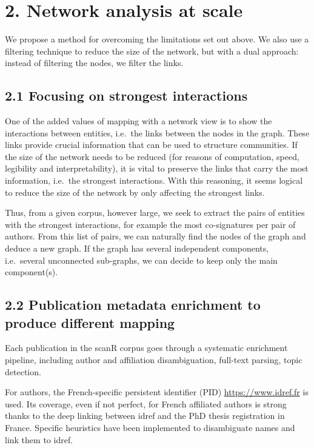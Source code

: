 \documentclass[
]{article}
\begin{document}
\hypertarget{network-analysis-at-scale}{%
\section{2. Network analysis at scale}\label{network-analysis-at-scale}}

We propose a method for overcoming the limitations set out above. We
also use a filtering technique to reduce the size of the network, but
with a dual approach: instead of filtering the nodes, we filter the
links.

\hypertarget{focusing-on-strongest-interactions}{%
\subsection{2.1 Focusing on strongest
interactions}\label{focusing-on-strongest-interactions}}

One of the added values of mapping with a network view is to show the
interactions between entities, i.e.~the links between the nodes in the
graph. These links provide crucial information that can be used to
structure communities. If the size of the network needs to be reduced
(for reasons of computation, speed, legibility and interpretability), it
is vital to preserve the links that carry the most information, i.e.~the
strongest interactions. With this reasoning, it seems logical to reduce
the size of the network by only affecting the strongest links.

Thus, from a given corpus, however large, we seek to extract the pairs
of entities with the strongest interactions, for example the most
co-signatures per pair of authors. From this list of pairs, we can
naturally find the nodes of the graph and deduce a new graph. If the
graph has several independent components, i.e.~several unconnected
sub-graphs, we can decide to keep only the main component(s).

\hypertarget{publication-metadata-enrichment-to-produce-different-mapping}{%
\subsection{2.2 Publication metadata enrichment to produce different
mapping}\label{publication-metadata-enrichment-to-produce-different-mapping}}

Each publication in the scanR corpus goes through a systematic
enrichment pipeline, including author and affiliation disambiguation,
full-text parsing, topic detection.

For authors, the French-specific persistent identifier (PID)
\url{https://www.idref.fr} is used. Its coverage, even if not perfect,
for French affiliated authors is strong thanks to the deep linking
between idref and the PhD thesis registration in France. Specific
heuristics have been implemented to disambiguate names and link them to
idref.
\end{document}
